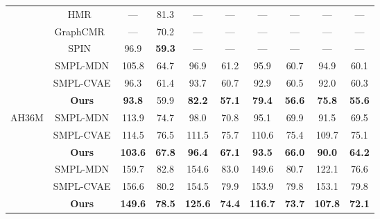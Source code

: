 \begin{table}[t]
\begin{tabular}{c|c|cccccccc}
& HMR~\cite{kanazawa18end-to-end}
& ---   & 81.3      
& ---   & ---       
& ---   & ---       
& ---   & ---       \\
& GraphCMR~\cite{kolotouros19convolutional}
& ---   & 70.2      
& ---   & ---       
& ---   & ---       
& ---   & ---       \\
& SPIN~\cite{kolotouros19learning}
& 96.9  & \textbf{59.3}
& ---   & ---       
& ---   & ---       
& ---   & ---       \\
& SMPL-MDN                
& 105.8 & 64.7
& 96.9  & 61.2
& 95.9  & 60.7     
& 94.9  & 60.1     \\
& SMPL-CVAE                
& 96.3  & 61.4      
& 93.7  & 60.7      
& 92.9  & 60.5      
& 92.0  & 60.3      \\
& \textbf{Ours}
& \textbf{93.8} & 59.9
& \textbf{82.2} & \textbf{57.1}
& \textbf{79.4} & \textbf{56.6}
& \textbf{75.8} & \textbf{55.6}
\\ 
\midrule
\multirow{4}{\wcolone}{AH36M}
& SMPL-MDN                
& 113.9  & 74.7
& 98.0   & 70.8
& 95.1   & 69.9     
& 91.5   & 69.5     \\
& SMPL-CVAE                
& 114.5  & 76.5
& 111.5  & 75.7     
& 110.6  & 75.4     
& 109.7  & 75.1     \\
& \textbf{Ours}
& \textbf{103.6} & \textbf{67.8}
& \textbf{96.4}  & \textbf{67.1}
& \textbf{93.5}  & \textbf{66.0} 
& \textbf{90.0}  & \textbf{64.2}     \\

\midrule
\multirow{4}{\wcolone}{A3DPW}
& SMPL-MDN                
& 159.7  & 82.8
& 154.6  & 83.0
& 149.6  & 80.7     
& 122.1  & 76.6     \\
& SMPL-CVAE                
& 156.6  & 80.2
& 154.5  & 79.9     
& 153.9  & 79.8     
& 153.1  & 79.8     \\
& \textbf{Ours}
& \textbf{149.6} & \textbf{78.5}
& \textbf{125.6}  & \textbf{74.4}
& \textbf{116.7}  & \textbf{73.7} 
& \textbf{107.8}  & \textbf{72.1}     \\



\bottomrule
\end{tabular}
\end{table}





